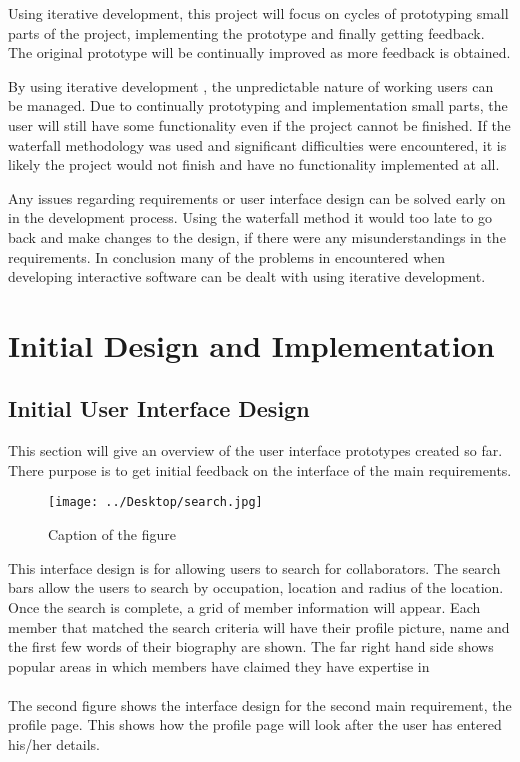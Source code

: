 \documentclass[a4paper,oneside,11pt]{report}
\begin{document}
Using iterative development, this project will focus on cycles of prototyping small parts of the project, implementing the prototype and finally getting feedback. The original prototype will be continually improved as more feedback is obtained.

By using iterative development , the unpredictable nature of working users can be managed. Due to continually prototyping and implementation small parts, the user will still have some functionality even if the project cannot be finished. If the waterfall methodology was used and significant difficulties were encountered, it is likely the project would not finish and have no functionality implemented at all. 

Any issues regarding requirements or user interface design can be solved early on in the development process. Using the waterfall method it would too late to go back and make changes to the design, if there were any misunderstandings in the requirements.
In conclusion many of the problems in encountered when developing interactive software can be dealt with using iterative development. 

\chapter{Initial Design and Implementation}
\section{Initial User Interface Design}
This section will give an overview of the user interface prototypes created so far. There purpose is to get initial feedback on the interface of the main requirements.

\begin{figure}[!ht]
\centering
\texttt{[image: ../Desktop/search.jpg]}
\caption{Caption of the figure}
\end{figure}
This interface design is for allowing users to search for collaborators. The search bars allow the users to search by occupation, location and radius of the location.
Once the search is complete, a grid of member information will appear. Each member that matched the search criteria will have their profile picture, name and the first few words of their biography are shown. The far right hand side shows popular areas in which members have claimed they have expertise in
\\
\\
The second figure shows the interface design for the second main requirement, the profile page. This shows how the profile page will look after the user has entered his/her details.
\end{document}
